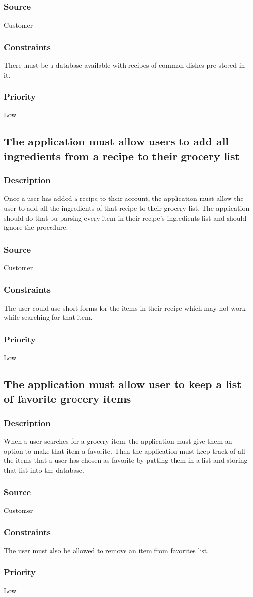 \subsubsection{Source}
Customer
\subsubsection{Constraints}
There must be a database available with recipes of common dishes pre-stored in it.
\subsubsection{Priority}
Low\\

\subsection{The application must allow users to add all ingredients from a recipe to their grocery list}
\subsubsection{Description}
Once a user has added a recipe to their account, the application must allow the user to add all the ingredients of that recipe to their grocery list. The application should do that bu parsing every item in their recipe's ingredients list and should ignore the procedure. 
\subsubsection{Source}
Customer
\subsubsection{Constraints}
The user could use short forms for the items in their recipe which may not work while searching for that item.
\subsubsection{Priority}
Low\\

\subsection{The application must allow user to keep a list of favorite grocery items}
\subsubsection{Description}
When a user searches for a grocery item, the application must give them an option to make that item a favorite. Then the application must keep track of all the items that a user has chosen as favorite by putting them in a list and storing that list into the database.  
\subsubsection{Source}
Customer
\subsubsection{Constraints}
The user must also be allowed to remove an item from favorites list.
\subsubsection{Priority}
Low
